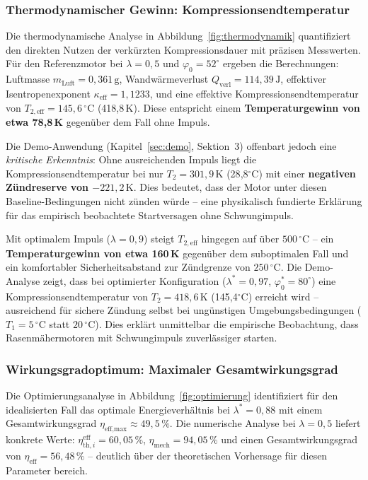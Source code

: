 ﻿\documentclass[a4paper,12pt]{article}
\begin{document}
\subsubsection*{Thermodynamischer Gewinn: Kompressionsendtemperatur}

Die thermodynamische Analyse in Abbildung~\ref{fig:thermodynamik} quantifiziert
den direkten Nutzen der verkürzten Kompressionsdauer mit präzisen Messwerten.
Für den Referenzmotor bei $\lambda = 0{,}5$ und $\varphi_0 = 52^\circ$ ergeben
die Berechnungen: Luftmasse $m_\text{Luft} = 0{,}361\,\text{g}$,
Wandwärmeverlust $Q_\text{verl} = 114{,}39\,\text{J}$, effektiver
Isentropenexponent $\kappa_\text{eff} = 1{,}1233$, und eine effektive
Kompressionsendtemperatur von $T_{2,\text{eff}} = 145{,}6\,^\circ\text{C}$
(418{,}8\,K). Diese entspricht einem \textbf{Temperaturgewinn von etwa
78{,}8\,K} gegenüber dem Fall ohne Impuls.

Die Demo-Anwendung (Kapitel~\ref{sec:demo}, Sektion~3) offenbart jedoch eine
\textit{kritische Erkenntnis}: Ohne ausreichenden Impuls liegt die
Kompressionsendtemperatur bei nur $T_2 = 301{,}9\,\text{K}$ (28{,}8$^\circ$C)
mit einer \textbf{negativen Zündreserve von $-221{,}2\,\text{K}$}. Dies bedeutet,
dass der Motor unter diesen Baseline-Bedingungen nicht zünden würde -- eine
physikalisch fundierte Erklärung für das empirisch beobachtete Startversagen
ohne Schwungimpuls.

Mit optimalem Impuls ($\lambda = 0{,}9$) steigt $T_{2,\text{eff}}$ hingegen
auf über \textbf{$500\,^\circ\text{C}$} -- ein \textbf{Temperaturgewinn von
etwa 160\,K} gegenüber dem suboptimalen Fall und ein komfortabler
Sicherheitsabstand zur Zündgrenze von $250\,^\circ\text{C}$. Die Demo-Analyse
zeigt, dass bei optimierter Konfiguration ($\lambda^* = 0{,}97$,
$\varphi_0^* = 80^\circ$) eine Kompressionsendtemperatur von
$T_2 = 418{,}6\,\text{K}$ (145{,}4$^\circ$C) erreicht wird -- ausreichend
für sichere Zündung selbst bei ungünstigen Umgebungsbedingungen
($T_1 = 5\,^\circ\text{C}$ statt $20\,^\circ\text{C}$). Dies erklärt
unmittelbar die empirische Beobachtung, dass Rasenmähermotoren mit
Schwungimpuls zuverlässiger starten.

\subsubsection*{Wirkungsgradoptimum: Maximaler Gesamtwirkungsgrad}

Die Optimierungsanalyse in Abbildung~\ref{fig:optimierung} identifiziert
für den idealisierten Fall das optimale Energieverhältnis bei $\lambda^* = 0{,}88$
mit einem Gesamtwirkungsgrad $\eta_\text{eff,max} \approx 49{,}5\,\%$.
Die numerische Analyse bei $\lambda = 0{,}5$ liefert konkrete Werte:
$\eta_{\text{th},i}^\text{eff} = 60{,}05\,\%$,
$\eta_\text{mech} = 94{,}05\,\%$ und einen Gesamtwirkungsgrad von
$\eta_\text{eff} = 56{,}48\,\%$ -- deutlich über der theoretischen
Vorhersage für diesen Parameter bereich.
\end{document}
